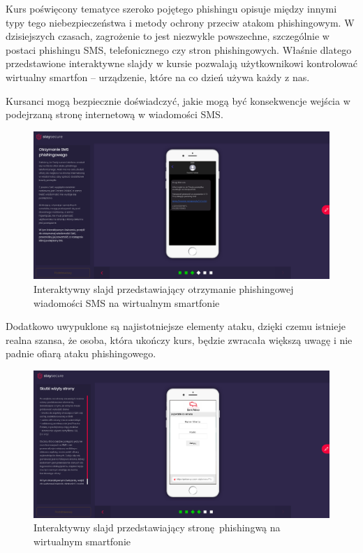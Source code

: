 \documentclass[12pt,twoside]{article}
\begin{document}
Kurs poświęcony tematyce szeroko pojętego phishingu opisuje między innymi typy tego niebezpieczeństwa i metody ochrony przeciw atakom phishingowym. W dzisiejszych czasach, zagrożenie to jest niezwykle powszechne, szczególnie w postaci phishingu SMS, telefonicznego czy stron phishingowych. Właśnie dlatego przedstawione interaktywne slajdy w kursie pozwalają użytkownikowi kontrolować wirtualny smartfon -- urządzenie, które na co dzień używa każdy z nas. 

Kursanci mogą bezpiecznie doświadczyć, jakie mogą być konsekwencje wejścia w podejrzaną stronę internetową w wiadomości SMS.

\begin{figure}[H]
	\centering
	\includegraphics[width=1\linewidth]{figures/phishing-slide-screenshot1.png}
	\caption{Interaktywny slajd przedstawiający otrzymanie phishingowej wiadomości SMS na wirtualnym smartfonie}
	\label{fig:phishing-organisations}
\end{figure}

Dodatkowo uwypuklone są najistotniejsze elementy ataku, dzięki czemu istnieje realna szansa, że osoba, która ukończy kurs, będzie zwracała większą uwagę i nie padnie ofiarą ataku phishingowego.

\begin{figure}[H]
	\centering
	\includegraphics[width=1\linewidth]{figures/phishing-slide-screenshot2.png}
	\caption{Interaktywny slajd przedstawiający stronę phishingwą na wirtualnym smartfonie}
	\label{fig:phishing-organisations}
\end{figure}
\end{document}

